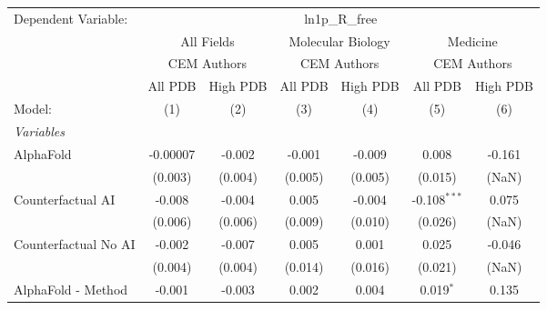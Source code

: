 \begingroup
\centering
\begin{tabular}{lcccccc}
   \tabularnewline \midrule \midrule
   Dependent Variable: & \multicolumn{6}{c}{ln1p\_R\_free}\\
 & \multicolumn{2}{c}{All Fields} & \multicolumn{2}{c}{Molecular Biology} & \multicolumn{2}{c}{Medicine} \\
\cmidrule(lr){2-3} \cmidrule(lr){4-5} \cmidrule(lr){6-7}
 & \multicolumn{2}{c}{CEM Authors} & \multicolumn{2}{c}{CEM Authors} & \multicolumn{2}{c}{CEM Authors} \\
\cmidrule(lr){2-3} \cmidrule(lr){4-5} \cmidrule(lr){6-7}
 & \multicolumn{1}{c}{All PDB} & \multicolumn{1}{c}{High PDB} & \multicolumn{1}{c}{All PDB} & \multicolumn{1}{c}{High PDB} & \multicolumn{1}{c}{All PDB} & \multicolumn{1}{c}{High PDB} \\
\cmidrule(lr){2-2} \cmidrule(lr){3-3} \cmidrule(lr){4-4} \cmidrule(lr){5-5} \cmidrule(lr){6-6} \cmidrule(lr){7-7}
   Model:                                                     & (1)           & (2)           & (3)           & (4)           & (5)            & (6)\\  
   \midrule
   \emph{Variables}\\
   AlphaFold                                                  & -0.00007      & -0.002        & -0.001        & -0.009        & 0.008          & -0.161\\   
                                                              & (0.003)       & (0.004)       & (0.005)       & (0.005)       & (0.015)        & (NaN)\\   
   Counterfactual AI                                          & -0.008        & -0.004        & 0.005         & -0.004        & -0.108$^{***}$ & 0.075\\   
                                                              & (0.006)       & (0.006)       & (0.009)       & (0.010)       & (0.026)        & (NaN)\\   
   Counterfactual No AI                                       & -0.002        & -0.007        & 0.005         & 0.001         & 0.025          & -0.046\\   
                                                              & (0.004)       & (0.004)       & (0.014)       & (0.016)       & (0.021)        & (NaN)\\   
   AlphaFold - Method                                         & -0.001        & -0.003        & 0.002         & 0.004         & 0.019$^{*}$    & 0.135\\   

\end{tabular}
